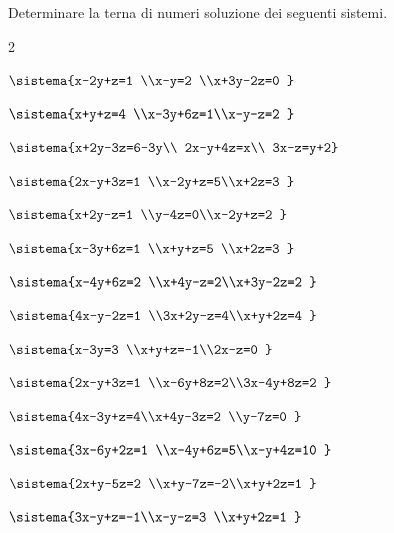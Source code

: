 \begin{esercizio}[*]
 \label{ese:22.57}
 Determinare la terna di numeri soluzione dei seguenti sistemi.
\begin{htmulticols}{2}
\begin{enumeratea}
\item \(\sistema{x-2y+z=1 \\x-y=2 \\x+3y-2z=0 
}\)
\item \(\sistema{x+y+z=4 \\x-3y+6z=1\\x-y-z=2 
}\)
\item 
\(\sistema{x+2y-3z=6-3y\\
2x-y+4z=x\\
3x-z=y+2}\)
\item \(\sistema{2x-y+3z=1 \\x-2y+z=5\\x+2z=3 
}\)
\item \(\sistema{x+2y-z=1 \\y-4z=0\\x-2y+z=2 
}\)
\item \(\sistema{x-3y+6z=1 \\x+y+z=5 \\x+2z=3 
}\)
\item \(\sistema{x-4y+6z=2 \\x+4y-z=2\\x+3y-2z=2 
}\)
\item \(\sistema{4x-y-2z=1 \\3x+2y-z=4\\x+y+2z=4 
}\)
\item 
\(\sistema{x-3y=3 \\x+y+z=-1\\2x-z=0 }\)
\item \(\sistema{2x-y+3z=1 \\x-6y+8z=2\\3x-4y+8z=2 
}\)
\item \(\sistema{4x-3y+z=4\\x+4y-3z=2 \\y-7z=0 
}\)
\item \(\sistema{3x-6y+2z=1 \\x-4y+6z=5\\x-y+4z=10 
}\)
\item \(\sistema{2x+y-5z=2 \\x+y-7z=-2\\x+y+2z=1 
}\)
\item \(\sistema{3x-y+z=-1\\x-y-z=3 \\x+y+2z=1 
}\)
\end{enumeratea}
\end{htmulticols}
\end{esercizio}

